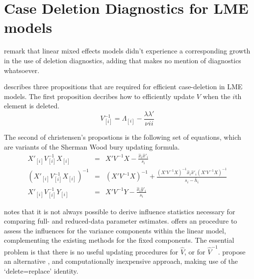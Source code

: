 \documentclass[Chap5amain.tex]{subfiles}
\begin{document}

 
 
 
 \section{Case Deletion Diagnostics for LME models}
 
 \citet{HaslettDillane} remark that linear mixed effects models
 didn't experience a corresponding growth in the use of deletion
 diagnostics, adding that \citet{McCullSearle} makes no mention of
 diagnostics whatsoever.
 
 \citet{Christensen} describes three propositions that are required
 for efficient case-deletion in LME models. The first proposition
 decribes how to efficiently update $V$ when the $i$th element is
 deleted.
 \begin{equation}
 	V_{[i]}^{-1} = \Lambda_{[i]} - \frac{\lambda
 		\lambda\prime}{\nu^{}ii}
 \end{equation}
 
 
 The second of christensen's propostions is the following set of
 equations, which are variants of the Sherman Wood bury updating
 formula.
 \begin{eqnarray}
 	X'_{[i]}V_{[i]}^{-1}X_{[i]} &=& X' V^{-1}X -
 	\frac{\hat{x}_{i}\hat{x}'_{i}}{s_{i}}\\
 	(X'_{[i]}V_{[i]}^{-1}X_{[i]})^{-1} &=& (X' V^{-1}X)^{-1} +
 	\frac{(X' V^{-1}X)^{-1}\hat{x}_{i}\hat{x}' _{i}
 		(X' V^{-1}X)^{-1}}{s_{i}- \bar{h}_{i}}\\
 	X'_{[i]}V_{[i]}^{-1}Y_{[i]} &=& X\prime V^{-1}Y -
 	\frac{\hat{x}_{i}\hat{y}' _{i}}{s_{i}}
 \end{eqnarray}
 
 
 
 
 

% 
 \citet{schabenberger} notes that it is not always possible to
 derive influence statistics necessary for comparing full- and
 reduced-data parameter estimates. \citet{HaslettDillane} offers an
 procedure to assess the influences for the variance components
 within the linear model, complementing the existing methods for
 the fixed components. The essential problem is that there is no
 useful updating procedures for $\hat{V}$, or for $\hat{V}^{-1}$.
 \citet{HaslettDillane} propose an alternative , and
 computationally inexpensive approach, making use of the
 `delete=replace' identity.
 
\end{document}
